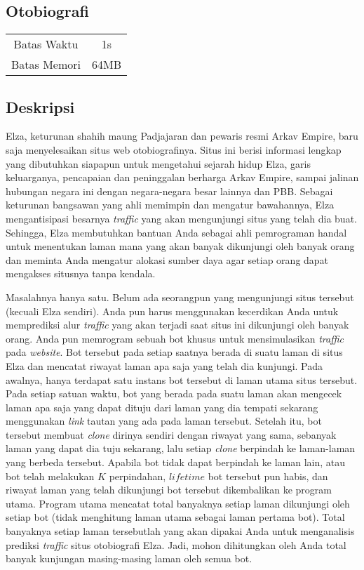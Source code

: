 \documentclass{article}
\begin{document}
\begin{center}
    \section*{Otobiografi} %

    \begin{tabular}{ | c c | }
        \hline
        Batas Waktu  & 1s \\    %
        Batas Memori & 64MB \\  %
        \hline
    \end{tabular}
\end{center}

\subsection*{Deskripsi}
Elza, keturunan shahih maung Padjajaran dan pewaris resmi Arkav Empire, baru saja menyelesaikan situs web otobiografinya. Situs ini berisi informasi lengkap yang dibutuhkan siapapun untuk mengetahui sejarah hidup Elza, garis keluarganya, pencapaian dan peninggalan berharga Arkav Empire, sampai jalinan hubungan negara ini dengan negara-negara besar lainnya dan PBB. Sebagai keturunan bangsawan yang ahli memimpin dan mengatur bawahannya, Elza mengantisipasi besarnya \textit{traffic} yang akan mengunjungi situs yang telah dia buat. Sehingga, Elza membutuhkan bantuan Anda sebagai ahli pemrograman handal untuk menentukan laman mana yang akan banyak dikunjungi oleh banyak orang dan meminta Anda mengatur alokasi sumber daya agar setiap orang dapat mengakses situsnya tanpa kendala.

Masalahnya hanya satu. Belum ada seorangpun yang mengunjungi situs tersebut (kecuali Elza sendiri). Anda pun harus menggunakan kecerdikan Anda untuk memprediksi alur \textit{traffic} yang akan terjadi saat situs ini dikunjungi oleh banyak orang. Anda pun memrogram sebuah bot khusus untuk mensimulasikan \textit{traffic} pada \textit{website}. Bot tersebut pada setiap saatnya berada di suatu laman di situs Elza dan mencatat riwayat laman apa saja yang telah dia kunjungi. Pada awalnya, hanya terdapat satu instans bot tersebut di laman utama situs tersebut. Pada setiap satuan waktu, bot yang berada pada suatu laman akan mengecek laman apa saja yang dapat dituju dari laman yang dia tempati sekarang menggunakan \textit{link} tautan yang ada pada laman tersebut. Setelah itu, bot tersebut membuat \textit{clone} dirinya sendiri dengan riwayat yang sama, sebanyak laman yang dapat dia tuju sekarang, lalu setiap \textit{clone} berpindah ke laman-laman yang berbeda tersebut. Apabila bot tidak dapat berpindah ke laman lain, atau bot telah melakukan $K$ perpindahan, $\textit{lifetime}$ bot tersebut pun habis, dan riwayat laman yang telah dikunjungi bot tersebut dikembalikan ke program utama. Program utama mencatat total banyaknya setiap laman dikunjungi oleh setiap bot (tidak menghitung laman utama sebagai laman pertama bot). Total banyaknya setiap laman tersebutlah yang akan dipakai Anda untuk menganalisis prediksi \textit{traffic} situs otobiografi Elza. Jadi, mohon dihitungkan oleh Anda total banyak kunjungan masing-masing laman oleh semua bot.
\end{document}
